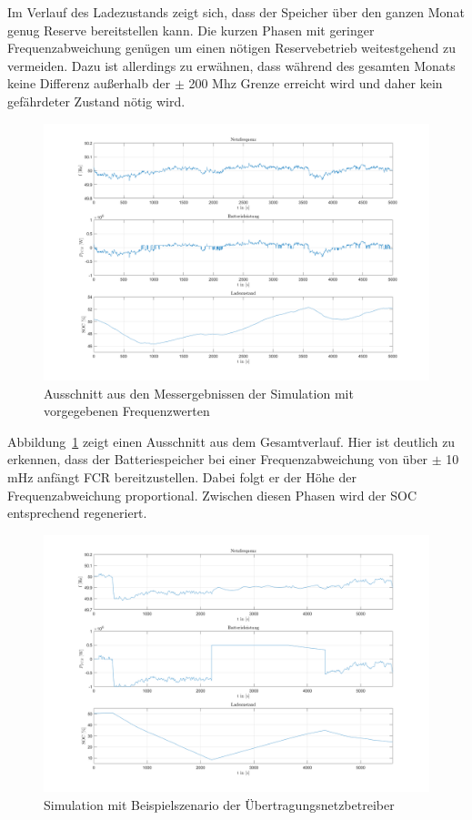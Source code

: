 Im Verlauf des Ladezustands zeigt sich, dass der Speicher über den ganzen Monat genug Reserve bereitstellen kann.
Die kurzen Phasen mit geringer Frequenzabweichung genügen um einen nötigen Reservebetrieb weitestgehend zu vermeiden.
Dazu ist allerdings zu erwähnen, dass während des gesamten Monats keine Differenz außerhalb der $\pm$ 200 Mhz Grenze erreicht wird
und daher kein gefährdeter Zustand nötig wird.

\begin{figure}[h!]
	\centering
	\includegraphics[width=14cm]{Abbildungen/SteuerungFCR2.png}
	\caption{Ausschnitt aus den Messergebnissen der Simulation mit vorgegebenen Frequenzwerten}\label{FCRMessung2}
\end{figure}

Abbildung~\ref{FCRMessung2} zeigt einen Ausschnitt aus dem Gesamtverlauf.
Hier ist deutlich zu erkennen, dass der Batteriespeicher bei einer Frequenzabweichung von über $\pm$ 10 mHz
anfängt FCR bereitzustellen.
Dabei folgt er der Höhe der Frequenzabweichung proportional. 
Zwischen diesen Phasen wird der SOC entsprechend regeneriert.

\begin{figure}[h!]
	\centering
	\includegraphics[width=14cm]{Abbildungen/SteuerungFCR3.png}
	\caption{Simulation mit Beispielszenario der Übertragungsnetzbetreiber}\label{FCRMessung3}
\end{figure}

